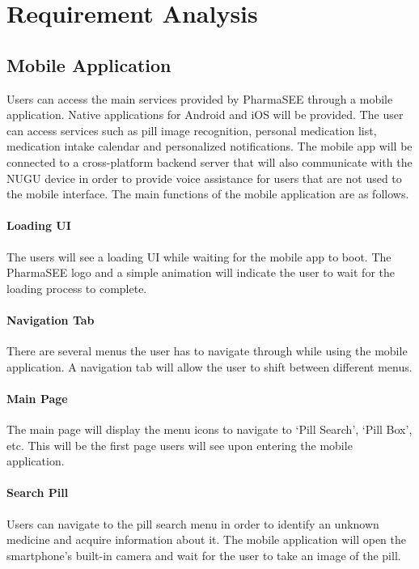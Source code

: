 \documentclass[conference]{IEEEtran}
\begin{document}
\section{Requirement Analysis}
\subsection{Mobile Application}\label{AA}
Users can access the main services provided by PharmaSEE through a mobile application. Native applications for Android and iOS will be provided. The user can access services such as pill image recognition, personal medication list, medication intake calendar and personalized notifications. The mobile app will be connected to a cross-platform backend server that will also communicate with the NUGU device in order to provide voice assistance for users that are not used to the mobile interface. The main functions of the mobile application are as follows.\\
\paragraph{Loading UI}The users will see a loading UI while waiting for the mobile app to boot. The PharmaSEE logo and a simple animation will indicate the user to wait for the loading process to complete.\\

\paragraph{Navigation Tab}There are several menus the user has to navigate through while using the mobile application. A navigation tab will allow the user to shift between different menus. \\

\paragraph{Main Page}The main page will display the menu icons to navigate to ‘Pill Search’, ‘Pill Box’, etc. This will be the first page users will see upon entering the mobile application.\\

\paragraph{Search Pill}Users can navigate to the pill search menu in order to identify an unknown medicine and acquire information about it. The mobile application will open the smartphone’s built-in camera and wait for the user to take an image of the pill.\\
\end{document}
